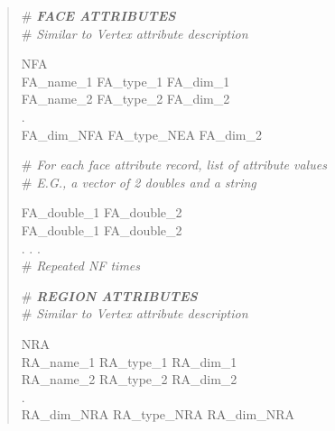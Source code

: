 \documentclass[12pt]{article}
\begin{document}
\begin{verse}
\# \textit{\textbf{FACE ATTRIBUTES}} \\
\# \textit{Similar to Vertex attribute description}
\vspace{1ex}

NFA \hspace{0.5ex} \\
FA\_name\_1 \hspace{0.5ex} FA\_type\_1 \hspace{0.5ex} FA\_dim\_1 \\ 
FA\_name\_2 \hspace{0.5ex} FA\_type\_2 \hspace{0.5ex} FA\_dim\_2 \\
. \\
FA\_dim\_NFA \hspace{0.5ex} FA\_type\_NEA \hspace{0.5ex} FA\_dim\_2  
\vspace{1ex}

\# \textit{For each face attribute record, list of attribute values} \\
\# \textit{E.G., a vector of 2 doubles and a string}
\vspace{1ex}

FA\_double\_1 \hspace{0.5ex} FA\_double\_2 \\
FA\_double\_1 \hspace{0.5ex} FA\_double\_2 \\
. . . \\
\# \textit{Repeated NF times}
\vspace{2ex}

\newpage
\# \textit{\textbf{REGION ATTRIBUTES}} \\
\# \textit{Similar to Vertex attribute description}
\vspace{1ex}

NRA \hspace{0.5ex} \\
RA\_name\_1 \hspace{0.5ex} RA\_type\_1 \hspace{0.5ex} RA\_dim\_1 \\ 
RA\_name\_2 \hspace{0.5ex} RA\_type\_2 \hspace{0.5ex} RA\_dim\_2 \\
. \\
RA\_dim\_NRA \hspace{0.5ex} RA\_type\_NRA \hspace{0.5ex} RA\_dim\_NRA 
\vspace{1ex}


\end{verse}
\end{document}
